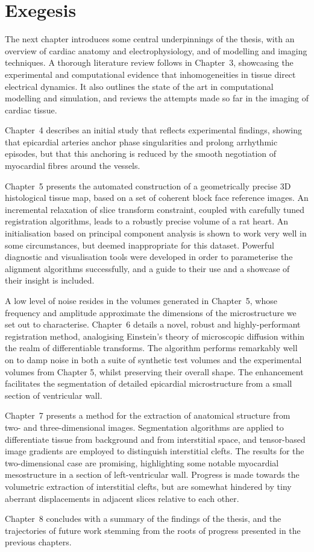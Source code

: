 \section{Exegesis}
\label{sec:intro:exegesis}
  The next chapter introduces some central underpinnings of the thesis, with an overview of cardiac anatomy and electrophysiology, and of modelling and imaging techniques. A thorough literature review follows in Chapter~3, showcasing the experimental and computational evidence that inhomogeneities in tissue direct electrical dynamics. It also outlines the state of the art in computational modelling and simulation, and reviews the attempts made so far in the imaging of cardiac tissue.
  
  Chapter~4 describes an initial study that reflects experimental findings, showing that epicardial arteries anchor phase singularities and prolong arrhythmic episodes, but that this anchoring is reduced by the smooth negotiation of myocardial fibres around the vessels.
  
  Chapter~5 presents the automated construction of a geometrically precise 3D histological tissue map, based on a set of coherent block face reference images. An incremental relaxation of slice transform constraint, coupled with carefully tuned registration algorithms, leads to a robustly precise volume of a rat heart. An initialisation based on principal component analysis is shown to work very well in some circumstances, but deemed inappropriate for this dataset. Powerful diagnostic and visualisation tools were developed in order to parameterise the alignment algorithms successfully, and a guide to their use and a showcase of their insight is included.
  
  A low level of noise resides in the volumes generated in Chapter~5, whose frequency and amplitude approximate the dimensions of the microstructure we set out to characterise. Chapter~6 details a novel, robust and highly-performant registration method, analogising Einstein's theory of microscopic diffusion within the realm of differentiable transforms. The algorithm performs remarkably well on to damp noise in both a suite of synthetic test volumes and the experimental volumes from Chapter 5, whilst preserving their overall shape. The enhancement facilitates the segmentation of detailed epicardial microstructure from a small section of ventricular wall.
  
  Chapter~7 presents a method for the extraction of anatomical structure from two- and three-dimensional images. Segmentation algorithms are applied to differentiate tissue from background and from interstitial space, and tensor-based image gradients are employed to distinguish interstitial clefts.  The results for the two-dimensional case are promising, highlighting some notable myocardial mesostructure in a section of left-ventricular wall. Progress is made towards the volumetric extraction of interstitial clefts, but are somewhat hindered by tiny aberrant displacements in adjacent slices relative to each other.
  
  Chapter~8 concludes with a summary of the findings of the thesis, and the  trajectories of future work stemming from the roots of progress presented in the previous chapters.
